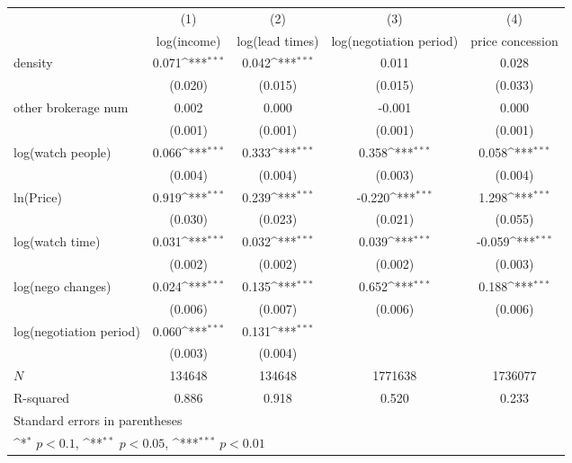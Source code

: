 {
\def\sym#1{\ifmmode^{#1}\else\(^{#1}\)\fi}
\begin{tabular}{l*{4}{c}}
\toprule
            &\multicolumn{1}{c}{(1)}&\multicolumn{1}{c}{(2)}&\multicolumn{1}{c}{(3)}&\multicolumn{1}{c}{(4)}\\
            &\multicolumn{1}{c}{log(income)}&\multicolumn{1}{c}{log(lead times)}&\multicolumn{1}{c}{log(negotiation period)}&\multicolumn{1}{c}{price concession}\\
\midrule
density     &       0.071\sym{***}&       0.042\sym{***}&       0.011         &       0.028         \\
            &     (0.020)         &     (0.015)         &     (0.015)         &     (0.033)         \\
\addlinespace
other brokerage num  &       0.002         &       0.000         &      -0.001         &       0.000         \\
            &     (0.001)         &     (0.001)         &     (0.001)         &     (0.001)         \\
\addlinespace
log(watch people)&       0.066\sym{***}&       0.333\sym{***}&       0.358\sym{***}&       0.058\sym{***}\\
            &     (0.004)         &     (0.004)         &     (0.003)         &     (0.004)         \\
\addlinespace
ln(Price)&       0.919\sym{***}&       0.239\sym{***}&      -0.220\sym{***}&       1.298\sym{***}\\
            &     (0.030)         &     (0.023)         &     (0.021)         &     (0.055)         \\
\addlinespace
log(watch time)&       0.031\sym{***}&       0.032\sym{***}&       0.039\sym{***}&      -0.059\sym{***}\\
            &     (0.002)         &     (0.002)         &     (0.002)         &     (0.003)         \\
\addlinespace
log(nego changes)&       0.024\sym{***}&       0.135\sym{***}&       0.652\sym{***}&       0.188\sym{***}\\
            &     (0.006)         &     (0.007)         &     (0.006)         &     (0.006)         \\
\addlinespace
log(negotiation period)&       0.060\sym{***}&       0.131\sym{***}&                     &                     \\
            &     (0.003)         &     (0.004)         &                     &                     \\
\midrule
\(N\)       &      134648         &      134648         &     1771638         &     1736077         \\
R-squared   &       0.886         &       0.918         &       0.520         &       0.233         \\
\bottomrule
\multicolumn{5}{l}{\footnotesize Standard errors in parentheses}\\
\multicolumn{5}{l}{\footnotesize \sym{*} \(p<0.1\), \sym{**} \(p<0.05\), \sym{***} \(p<0.01\)}\\
\end{tabular}
}
